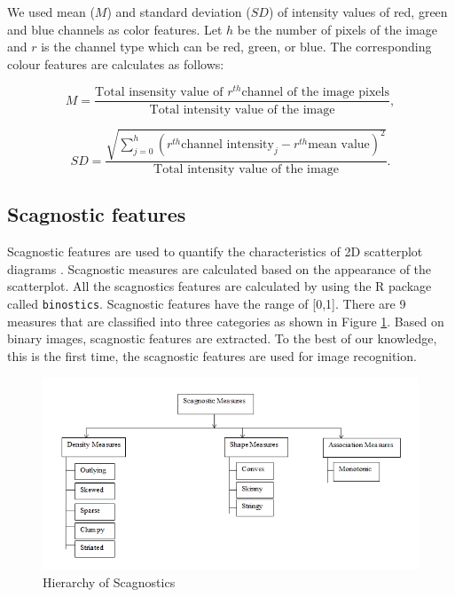 \documentclass{article}
\begin{document}
We used mean (\(M\)) and standard deviation (\(SD\)) of intensity
values of red, green and blue channels as color features. Let \(h\) be
the number of pixels of the image and \(r\) is the channel type which
can be red, green, or blue. The corresponding colour features are
calculates as follows:


\begin{equation}
    M = \frac{\text{Total insensity value of } r^{th} \text{channel of the image pixels}}{\text{Total intensity value of the image}},
\label{equa2}
\end{equation}

\begin{equation}
    SD = \frac{\sqrt{\sum_{j=0}^{h}(r^{th} \text{channel intensity}_j - r^{th} \text{mean value})^2}}{\text{Total intensity value of the image}}.
\label{equa3}
\end{equation}

\hypertarget{scagnostic-features}{%
\subsection{Scagnostic features}\label{scagnostic-features}}


Scagnostic features are used to quantify the characteristics of 2D
scatterplot diagrams \citep{article37}. Scagnostic measures
are calculated based on the appearance of the scatterplot. All the
scagnostics features are calculated by using the R package called
\texttt{binostics}. Scagnostic features have the range of {[}0,1{]}.
There are 9 measures that are classified into three categories as shown
in Figure \ref{scagimg}. Based on binary images, scagnostic features are
extracted. To the best of our knowledge, this is the first time, the
scagnostic features are used for image recognition.


\begin{figure}[!ht]

\centering 
\includegraphics[width=0.7\linewidth]{leaffeatures/scag_new} 

\caption{\label{scagimg}Hierarchy of Scagnostics}%

\end{figure}
\end{document}
